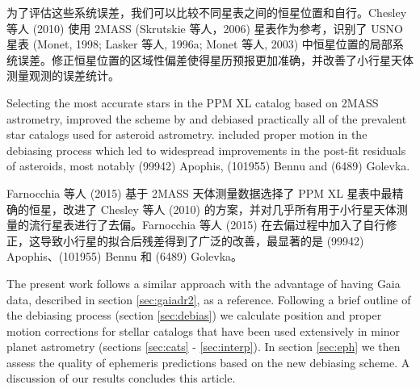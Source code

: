\documentclass[review]{elsarticle}
\begin{document}
为了评估这些系统误差，我们可以比较不同星表之间的恒星位置和自行。Chesley 等人 (2010) 使用 2MASS (Skrutskie 等人，2006) 星表作为参考，识别了 USNO 星表 (Monet, 1998; Lasker 等人, 1996a; Monet 等人, 2003) 中恒星位置的局部系统误差。修正恒星位置的区域性偏差使得星历预报更加准确，并改善了小行星天体测量观测的误差统计。

Selecting the most accurate stars in the PPM XL catalog based on 2MASS astrometry, \cite{farnocchia15} improved the scheme by \cite{chesley10} and debiased practically all of the prevalent star catalogs used for asteroid astrometry. \cite{farnocchia15} included proper motion in the debiasing process which led to widespread improvements in the post-fit residuals of asteroids, most notably (99942) Apophis, (101955) Bennu and (6489) Golevka. 

Farnocchia 等人 (2015) 基于 2MASS 天体测量数据选择了 PPM XL 星表中最精确的恒星，改进了 Chesley 等人 (2010) 的方案，并对几乎所有用于小行星天体测量的流行星表进行了去偏。Farnocchia 等人 (2015) 在去偏过程中加入了自行修正，这导致小行星的拟合后残差得到了广泛的改善，最显著的是 (99942) Apophis、(101955) Bennu 和 (6489) Golevka。 

%
The present work follows a similar approach with the advantage of having Gaia data, described in section \ref{sec:gaiadr2}, as a reference. 
Following a brief outline of the debiasing process (section \ref{sec:debias}) we calculate position and proper motion corrections for stellar catalogs that have been used extensively in minor planet astrometry (sections \ref{sec:cats} - \ref{sec:interp}). 
In section \ref{sec:eph} we then assess the quality of ephemeris predictions based on the new debiasing scheme.
A discussion of our results concludes this article.
\end{document}
